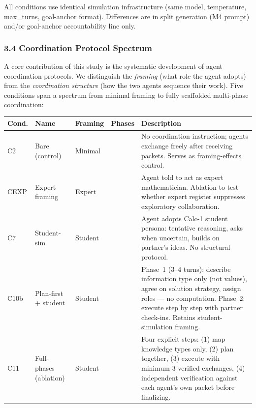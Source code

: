 \documentclass[
  11pt,
]{article}
\newcounter{none} %
\begin{document}
All conditions use identical simulation infrastructure (same model,
temperature, max\_turns, goal-anchor format). Differences are in split
generation (M4 prompt) and/or goal-anchor accountability line only.

\subsubsection{3.4 Coordination Protocol Spectrum}\label{coordination-protocol-spectrum}

A core contribution of this study is the systematic development of agent coordination protocols. We distinguish the \emph{framing} (what role the agent adopts) from the \emph{coordination structure} (how the two agents sequence their work). Five conditions span a spectrum from minimal framing to fully scaffolded multi-phase coordination:

{\def\LTcaptype{none} %
\begin{longtable}[]{@{}
  >{\raggedright\arraybackslash}p{}
  >{\raggedright\arraybackslash}p{}
  >{\raggedright\arraybackslash}p{}
  >{\raggedright\arraybackslash}p{}
  >{\raggedright\arraybackslash}p{}@{}}
\toprule\noalign{}
Cond. & Name & Framing & Phases & Description \\
\midrule\noalign{}
\endhead
\bottomrule\noalign{}
\endlastfoot
C2 & Bare (control) & Minimal & 1 & No coordination instruction; agents exchange freely after receiving packets. Serves as framing-effects control. \\
CEXP & Expert framing & Expert & 1 & Agent told to act as expert mathematician. Ablation to test whether expert register suppresses exploratory collaboration. \\
C7 & Student-sim & Student & 1 & Agent adopts Calc-1 student persona: tentative reasoning, asks when uncertain, builds on partner's ideas. No structural protocol. \\
C10b & Plan-first + student & Student & 2 & Phase~1 (3--4 turns): describe information type only (not values), agree on solution strategy, assign roles --- no computation. Phase~2: execute step by step with partner check-ins. Retains student-simulation framing. \\
C11 & Full-phases (ablation) & Student & 4 & Four explicit steps: (1) map knowledge types only, (2) plan together, (3) execute with minimum 3 verified exchanges, (4) independent verification against each agent's own packet before finalizing. \\
\end{longtable}
}
\end{document}
